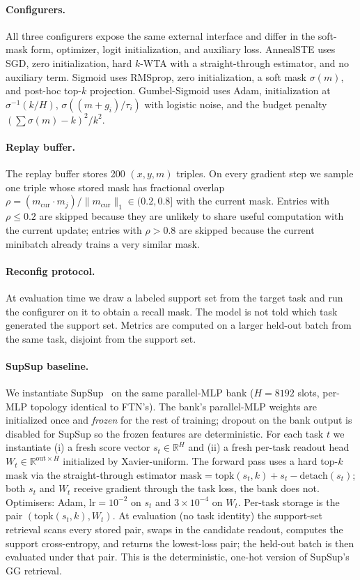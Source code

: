 \documentclass{article}
\begin{document}
\paragraph{Configurers.}
All three configurers expose the same external interface and differ in the soft-mask form, optimizer, logit initialization, and auxiliary loss. AnnealSTE uses SGD, zero initialization, hard $k$-WTA with a straight-through estimator, and no auxiliary term. Sigmoid uses RMSprop, zero initialization, a soft mask $\sigma(m)$, and post-hoc top-$k$ projection. Gumbel-Sigmoid uses Adam, initialization at $\sigma^{-1}(k/H)$, $\sigma((m+g_i)/\tau_i)$ with logistic noise, and the budget penalty $(\sum\sigma(m)-k)^2/k^2$.

\paragraph{Replay buffer.}
The replay buffer stores 200 $(x,y,m)$ triples. On every gradient step we sample one triple whose stored mask has fractional overlap $\rho=(m_\mathrm{cur}\cdot m_j)/\|m_\mathrm{cur}\|_1\in(0.2,0.8]$ with the current mask. Entries with $\rho\le0.2$ are skipped because they are unlikely to share useful computation with the current update; entries with $\rho>0.8$ are skipped because the current minibatch already trains a very similar mask.

\paragraph{Reconfig protocol.}
At evaluation time we draw a labeled support set from the target task and run the configurer on it to obtain a recall mask. The model is not told which task generated the support set. Metrics are computed on a larger held-out batch from the same task, disjoint from the support set.

\paragraph{SupSup baseline.}
We instantiate SupSup~\citep{wortsman2020supermasks} on the same parallel-MLP bank ($H=8192$ slots, per-MLP topology identical to FTN's). The bank's parallel-MLP weights are initialized once and \emph{frozen} for the rest of training; dropout on the bank output is disabled for SupSup so the frozen features are deterministic. For each task $t$ we instantiate (i) a fresh score vector $s_t\in\mathbb{R}^H$ and (ii) a fresh per-task readout head $W_t \in \mathbb{R}^{\mathrm{out}\times H}$ initialized by Xavier-uniform. The forward pass uses a hard top-$k$ mask via the straight-through estimator $\mathrm{mask} = \mathrm{topk}(s_t, k) + s_t - \mathrm{detach}(s_t)$; both $s_t$ and $W_t$ receive gradient through the task loss, the bank does not. Optimisers: Adam, $\mathrm{lr}=10^{-2}$ on $s_t$ and $3\times10^{-4}$ on $W_t$. Per-task storage is the pair $(\mathrm{topk}(s_t,k), W_t)$. At evaluation (no task identity) the support-set retrieval scans every stored pair, swaps in the candidate readout, computes the support cross-entropy, and returns the lowest-loss pair; the held-out batch is then evaluated under that pair. This is the deterministic, one-hot version of SupSup's GG retrieval.
\end{document}
